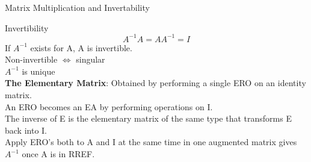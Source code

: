 \documentclass[a4paper, 12pt]{article}
\begin{document}
\begin{section}{Matrix Multiplication and Invertability}
\begin{subsection}{Invertibility}
\begin{equation}
	A^{-1}A=AA^{-1}=I
\end{equation}
If $A^{-1}$ exists for A, A is invertible.\\
Non-invertible $\Leftrightarrow$ singular\\
$A^{-1}$ is unique\\
\textbf{The Elementary Matrix}: Obtained by performing a single ERO on an
identity matrix.\\
An ERO becomes an EA by performing operations on I.\\
The inverse of E is the elementary matrix of the same type that transforms
E back into I.\\ 
Apply ERO's both to A and I at the same time in one augmented matrix gives
$A^{-1}$ once A is in RREF.
\end{subsection}

\end{section}
\end{document}
